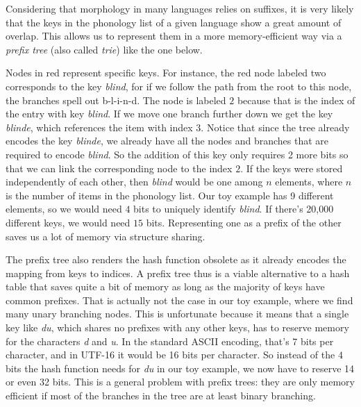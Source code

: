 Considering that morphology in many languages relies on suffixes, it is very likely that the keys in the phonology list of a given language show a great amount of overlap.
This allows us to represent them in a more memory-efficient way via a \emph{prefix tree} (also called \emph{trie}) like the one below.
%
\begin{center}
    
\end{center}
%
Nodes in red represent specific keys.
For instance, the red node labeled two corresponds to the key \emph{blind}, for if we follow the path from the root to this node, the branches spell out b-l-i-n-d.
The node is labeled $2$ because that is the index of the entry with key \emph{blind}.
If we move one branch further down we get the key \emph{blinde}, which references the item with index $3$.
Notice that since the tree already encodes the key \emph{blinde}, we already have all the nodes and branches that are required to encode \emph{blind}.
So the addition of this key only requires 2 more bits so that we can link the corresponding node to the index $2$.
If the keys were stored independently of each other, then \emph{blind} would be one among $n$ elements, where $n$ is the number of items in the phonology list.
Our toy example has 9 different elements, so we would need $4$ bits to uniquely identify \emph{blind}.
If there's 20,000 different keys, we would need $15$ bits.
Representing one as a prefix of the other saves us a lot of memory via structure sharing.

The prefix tree also renders the hash function obsolete as it already encodes the mapping from keys to indices.
A prefix tree thus is a viable alternative to a hash table that saves quite a bit of memory as long as the majority of keys have common prefixes.
That is actually not the case in our toy example, where we find many unary branching nodes.
This is unfortunate because it means that a single key like \emph{du}, which shares no prefixes with any other keys, has to reserve memory for the characters \emph{d} and \emph{u}.
In the standard ASCII encoding, that's 7 bits per character, and in UTF-16 it would be 16 bits per character.
So instead of the $4$ bits the hash function needs for \emph{du} in our toy example, we now have to reserve 14 or even 32 bits.
This is a general problem with prefix trees: they are only memory efficient if most of the branches in the tree are at least binary branching.

